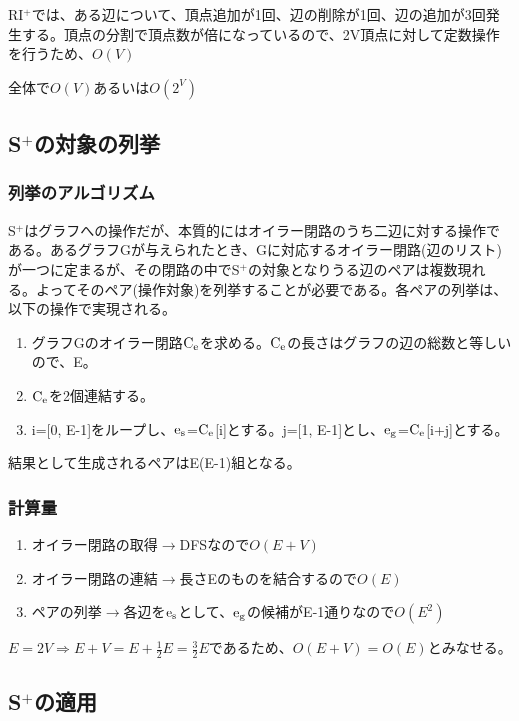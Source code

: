 \documentclass[11pt,a4j]{jarticle}
\newcommand{\splus}{S${}^\text{+}$}
\newcommand{\riplus}{RI${}^\text{+}$}
\newcommand{\fl}[1]{$\rm{#1}$}
\newcommand{\ra }{$\rightarrow$}
\begin{document}
\riplus では、ある辺について、頂点追加が1回、辺の削除が1回、辺の追加が3回発生する。頂点の分割で頂点数が倍になっているので、2V頂点に対して定数操作を行うため、$O(V)$

全体で$O(V)$あるいは$O(2^V)$

\subsection{\splus の対象の列挙}
\label{enum}
\subsubsection{列挙のアルゴリズム}
\splus はグラフへの操作だが、本質的にはオイラー閉路のうち二辺に対する操作である。あるグラフGが与えられたとき、Gに対応するオイラー閉路(辺のリスト)が一つに定まるが、その閉路の中で\splus の対象となりうる辺のペアは複数現れる。よってそのペア(操作対象)を列挙することが必要である。各ペアの列挙は、以下の操作で実現される。

\begin{enumerate}
    \item グラフGのオイラー閉路\fl{C_e}を求める。\fl{C_e}の長さはグラフの辺の総数と等しいので、E。
    \item \fl{C_e}を2個連結する。
    \item i=[0, E-1]をループし、\fl{e_s}=\fl{C_e}[i]とする。j=[1, E-1]とし、\fl{e_g}=\fl{C_e}[i+j]とする。
\end{enumerate}

結果として生成されるペアはE(E-1)組となる。

\subsubsection{計算量}
\begin{enumerate}
    \item オイラー閉路の取得\ra DFSなので$O(E+V)$
    \item オイラー閉路の連結\ra 長さEのものを結合するので$O(E)$
    \item ペアの列挙\ra 各辺を\fl{e_s}として、\fl{e_g}の候補がE-1通りなので$O(E^2)$
\end{enumerate}
$E=2V \Rightarrow E+V=E+\frac{1}{2}E=\frac{3}{2}E$であるため、$O(E+V)=O(E)$とみなせる。

\subsection{\splus の適用}
\end{document}
